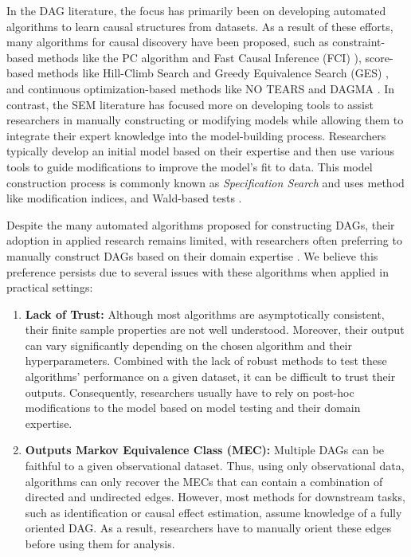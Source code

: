 \documentclass[letterpaper]{article} %
\begin{document}
In the DAG literature, the focus has primarily been on developing automated
algorithms to learn causal structures from datasets. As a result of these
efforts, many algorithms for causal discovery have been proposed, such as
constraint-based methods like the PC algorithm \citep{Spirtes2001} and Fast
Causal Inference (FCI) \citep{Spirtes2000}), score-based methods like
Hill-Climb Search and Greedy Equivalence Search (GES) \citep{Chickering2002},
and continuous optimization-based methods like NO TEARS \citep{Zheng2018} and
DAGMA \citep{Bello2022}. In contrast, the SEM literature has focused more on
developing tools to assist researchers in manually constructing or modifying
models while allowing them to integrate their expert knowledge into the
model-building process. Researchers typically develop an initial model based on
their expertise and then use various tools to guide modifications to improve
the model's fit to data. This model construction process is commonly known as
\emph{Specification Search} \citep{Long1983} and uses method like modification
indices, and Wald-based tests \citep{Marcoulides2018}.

Despite the many automated algorithms proposed for constructing DAGs, their
adoption in applied research remains limited, with researchers often preferring
to manually construct DAGs based on their domain expertise \citep{Tennant2020,
Petersen2021}. We believe this preference persists due to several issues with
these algorithms when applied in practical settings:

\begin{enumerate}
	\item \textbf{Lack of Trust:} Although most algorithms are
		asymptotically consistent, their finite sample properties are
		not well understood. Moreover, their output can vary
		significantly depending on the chosen algorithm and their
		hyperparameters. Combined with the lack of robust methods to
		test these algorithms' performance on a given dataset, it can
		be difficult to trust their outputs. Consequently, researchers
		usually have to rely on post-hoc modifications to the model
		based on model testing and their domain expertise.
	\item \textbf{Outputs Markov Equivalence Class (MEC):} Multiple
		DAGs can be faithful to a given observational dataset. Thus,
		using only observational data, algorithms can only recover the
		MECs that can contain a combination of directed and undirected
		edges. However, most methods for downstream tasks, such as
		identification or causal effect estimation, assume knowledge of
		a fully oriented DAG. As a result, researchers have to manually
		orient these edges before using them for analysis.
\end{enumerate}
\end{document}
